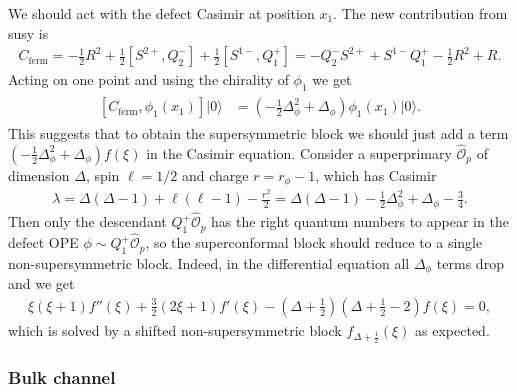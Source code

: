 \documentclass[letterpaper]{article}
\let\Oldsubsubsection\subsubsection
\renewcommand{\subsubsection}{\FloatBarrier\Oldsubsubsection}
\def\Om{{\mathcal{O}}}
\begin{document}
We should act with the defect Casimir at position $x_1$. 
The new contribution from susy is 
\begin{align}
 C_{\text{ferm}} =
 - \frac{1}{2} R^2 
 + \frac{1}{2} [S^{2+}, Q^-_2] 
 + \frac{1}{2} [S^{1-}, Q^+_1] 
 = - Q^-_2 S^{2+} 
   + S^{1-} Q^+_1 
   - \frac{1}{2} R^2 
   + R.
\end{align}
Acting on one point and using the chirality of $\phi_1$ we get
\begin{align}
\begin{split}
 [C_{\text{ferm}}, \phi_1(x_1) ] |0\rangle
 & = \left( -\frac{1}{2} \Delta_\phi^2 + \Delta_\phi \right) \phi_1(x_1) |0\rangle.
\end{split}
\end{align}
This suggests that to obtain the supersymmetric block we should just add a term
$( -\frac{1}{2} \Delta_\phi^2 + \Delta_\phi ) f(\xi)$ in the Casimir equation.
Consider a superprimary $\hat \Om_{p}$ of dimension $\Delta$, spin $\ell = 1/2$ and charge $r = r_\phi - 1$, which has Casimir
\begin{align}
 \lambda 
 = \Delta(\Delta-1) + \ell(\ell - 1) - \frac{r^2}{2} 
 = \Delta(\Delta-1) -\frac{1}{2} \Delta_\phi^2 + \Delta_\phi - \frac{3}{4}.
\end{align}
Then only the descendant $Q^+_{1} \hat \Om_{p}$ has the right quantum numbers to appear in the defect OPE $\phi \sim Q^+_{1} \hat \Om_{p}$, so the superconformal block should reduce to a single non-supersymmetric block.
Indeed, in the differential equation all $\Delta_\phi$ terms drop and we get
\begin{align}
 \xi  (\xi +1) f''(\xi )+\frac{3}{2} (2 \xi +1) f'(\xi )
 -\left(\Delta + \frac{1}{2} \right) \left( \Delta + \frac{1}{2} - 2 \right) f(\xi ) = 0,
\end{align}
which is solved by a shifted non-supersymmetric block $f_{\Delta+\frac{1}{2}}(\xi)$ as expected.


\subsubsection{Bulk channel}
\end{document}
